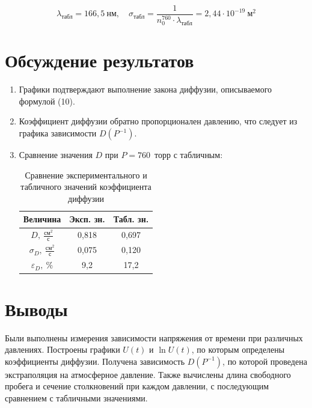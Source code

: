 \documentclass[a4paper,12pt]{article}
\begin{document}
\begin{equation*}
    \lambda_{\text{табл}} = 166{,}5~\text{нм}, \quad \sigma_{\text{табл}} = \frac{1}{n_0^{760} \cdot \lambda_{\text{табл}}} = 2{,}44 \cdot 10^{-19}~\text{м}^2
\end{equation*}

\section{Обсуждение результатов}

\begin{enumerate}
    \item Графики подтверждают выполнение закона диффузии, описываемого формулой (10).
    \item Коэффициент диффузии обратно пропорционален давлению, что следует из графика зависимости $D(P^{-1})$.
    \item Сравнение значения $D$ при $P=760$~торр с табличным:

    \begin{table}[H]
        \centering
        \begin{tabular}{|c|c|c|}
            \hline
            Величина & Эксп. зн. & Табл. зн. \\
            \hline
            $D,\ \frac{\text{см}^2}{\text{с}}$ & 0{,}818 & 0{,}697 \\ \hline
            $\sigma_D,\ \frac{\text{см}^2}{\text{с}}$ & 0{,}075 & 0{,}120 \\ \hline
            $\varepsilon_D,\ \%$ & 9{,}2 & 17{,}2 \\
            \hline
        \end{tabular}
        \caption{Сравнение экспериментального и табличного значений коэффициента диффузии}
    \end{table}

\end{enumerate}

\section{Выводы}

Были выполнены измерения зависимости напряжения от времени при различных давлениях. Построены графики $U(t)$ и $\ln U(t)$, по которым определены коэффициенты диффузии. Получена зависимость $D(P^{-1})$, по которой проведена экстраполяция на атмосферное давление. Также вычислены длина свободного пробега и сечение столкновений при каждом давлении, с последующим сравнением с табличными значениями.
\end{document}
